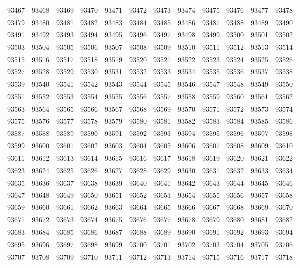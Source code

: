 \begin{center}
\begin{longtable}{llllllllllll}
93467 &93468 &93469 &93470 &93471 &93472 &93473 &93474 &93475 &93476 &93477 &93478 \\
93479 &93480 &93481 &93482 &93483 &93484 &93485 &93486 &93487 &93488 &93489 &93490 \\
93491 &93492 &93493 &93494 &93495 &93496 &93497 &93498 &93499 &93500 &93501 &93502 \\
93503 &93504 &93505 &93506 &93507 &93508 &93509 &93510 &93511 &93512 &93513 &93514 \\
93515 &93516 &93517 &93518 &93519 &93520 &93521 &93522 &93523 &93524 &93525 &93526 \\
93527 &93528 &93529 &93530 &93531 &93532 &93533 &93534 &93535 &93536 &93537 &93538 \\
93539 &93540 &93541 &93542 &93543 &93544 &93545 &93546 &93547 &93548 &93549 &93550 \\
93551 &93552 &93553 &93554 &93555 &93556 &93557 &93558 &93559 &93560 &93561 &93562 \\
93563 &93564 &93565 &93566 &93567 &93568 &93569 &93570 &93571 &93572 &93573 &93574 \\
93575 &93576 &93577 &93578 &93579 &93580 &93581 &93582 &93583 &93584 &93585 &93586 \\
93587 &93588 &93589 &93590 &93591 &93592 &93593 &93594 &93595 &93596 &93597 &93598 \\
93599 &93600 &93601 &93602 &93603 &93604 &93605 &93606 &93607 &93608 &93609 &93610 \\
93611 &93612 &93613 &93614 &93615 &93616 &93617 &93618 &93619 &93620 &93621 &93622 \\
93623 &93624 &93625 &93626 &93627 &93628 &93629 &93630 &93631 &93632 &93633 &93634 \\
93635 &93636 &93637 &93638 &93639 &93640 &93641 &93642 &93643 &93644 &93645 &93646 \\
93647 &93648 &93649 &93650 &93651 &93652 &93653 &93654 &93655 &93656 &93657 &93658 \\
93659 &93660 &93661 &93662 &93663 &93664 &93665 &93666 &93667 &93668 &93669 &93670 \\
93671 &93672 &93673 &93674 &93675 &93676 &93677 &93678 &93679 &93680 &93681 &93682 \\
93683 &93684 &93685 &93686 &93687 &93688 &93689 &93690 &93691 &93692 &93693 &93694 \\
93695 &93696 &93697 &93698 &93699 &93700 &93701 &93702 &93703 &93704 &93705 &93706 \\
93707 &93708 &93709 &93710 &93711 &93712 &93713 &93714 &93715 &93716 &93717 &93718 \\

\end{longtable}
\end{center}
